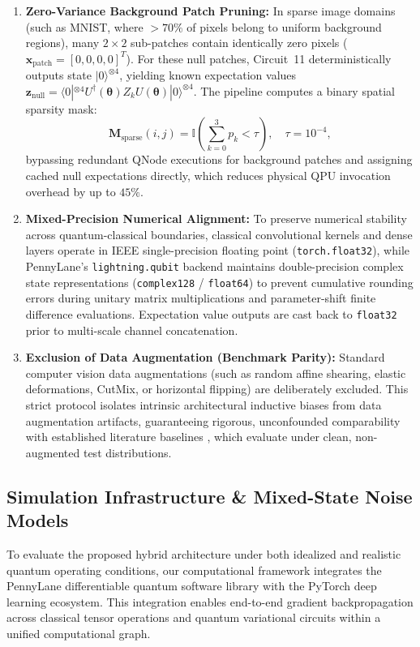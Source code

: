 \documentclass[pdflatex,sn-mathphys-num]{sn-jnl}%
\theoremstyle{thmstyleone}%
\theoremstyle{thmstyletwo}%
\theoremstyle{thmstylethree}%
\begin{document}
\begin{enumerate}
    \item \textbf{Zero-Variance Background Patch Pruning:} In sparse image domains (such as MNIST, where ${>}70\%$ of pixels belong to uniform background regions), many $2 \times 2$ sub-patches contain identically zero pixels ($\mathbf{x}_{\mathrm{patch}} = [0,0,0,0]^T$). For these null patches, Circuit~11 deterministically outputs state $|0\rangle^{\otimes 4}$, yielding known expectation values $\mathbf{z}_{\mathrm{null}} = \langle 0|^{\otimes 4} U^\dagger(\boldsymbol{\theta}) Z_k U(\boldsymbol{\theta}) |0\rangle^{\otimes 4}$. The pipeline computes a binary spatial sparsity mask:
    \begin{equation}
    \mathbf{M}_{\mathrm{sparse}}(i, j) = \mathbb{I}\left( \sum_{k=0}^3 p_k < \tau \right), \quad \tau = 10^{-4},
    \label{eq:sparsity_mask}
    \end{equation}
    bypassing redundant QNode executions for background patches and assigning cached null expectations directly, which reduces physical QPU invocation overhead by up to $45\%$.
    
    \item \textbf{Mixed-Precision Numerical Alignment:} To preserve numerical stability across quantum-classical boundaries, classical convolutional kernels and dense layers operate in IEEE single-precision floating point (\texttt{torch.float32}), while PennyLane's \texttt{lightning.qubit} backend maintains double-precision complex state representations (\texttt{complex128} / \texttt{float64}) to prevent cumulative rounding errors during unitary matrix multiplications and parameter-shift finite difference evaluations. Expectation value outputs are cast back to \texttt{float32} prior to multi-scale channel concatenation.
    
    \item \textbf{Exclusion of Data Augmentation (Benchmark Parity):} Standard computer vision data augmentations (such as random affine shearing, elastic deformations, CutMix, or horizontal flipping) are deliberately excluded. This strict protocol isolates intrinsic architectural inductive biases from data augmentation artifacts, guaranteeing rigorous, unconfounded comparability with established literature baselines \cite{henderson2020quanvolutional, senokosov2024quantum, liu2026parallel}, which evaluate under clean, non-augmented test distributions.
\end{enumerate}

\subsection{Simulation Infrastructure \& Mixed-State Noise Models}
\label{subsec:simulation_infrastructure}
To evaluate the proposed hybrid architecture under both idealized and realistic quantum operating conditions, our computational framework integrates the PennyLane differentiable quantum software library \cite{bergholm2018pennylane} with the PyTorch deep learning ecosystem. This integration enables end-to-end gradient backpropagation across classical tensor operations and quantum variational circuits within a unified computational graph.
\end{document}
